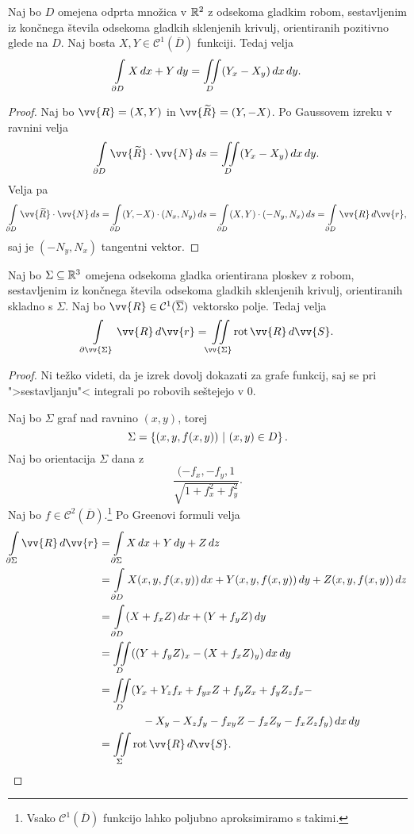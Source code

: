 \begin{izrek}
Naj bo $D$ omejena odprta množica v $\mathbb{R}^2$ z odsekoma gladkim
robom, sestavljenim iz končnega števila odsekoma gladkih sklenjenih
krivulj, orientiranih pozitivno glede na $D$. Naj bosta
$X, Y \in \mathcal{C}^1(\overline{D})$ funkciji. Tedaj velja
\[
\int\limits_{\partial D} X\,dx + Y\,dy = \iint\limits_D (Y_x - X_y)\,dx\,dy.
\]
\end{izrek}

\begin{proof}
Naj bo $\vv{R} = (X, Y)$ in $\vv{\widetilde{R}} = (Y, -X)$. Po
Gaussovem izreku v ravnini velja
\[
\lint_{\partial D} \vv{\widetilde{R}} \cdot \vv{N}\,ds =
\liint_D (Y_x - X_y)\,dx\,dy.
\]
Velja pa
\[
\lint_{\partial D} \vv{\widetilde{R}} \cdot \vv{N}\,ds =
\lint_{\partial D} (Y, -X) \cdot (N_x, N_y)\,ds =
\lint_{\partial D} (X, Y) \cdot (-N_y, N_x)\,ds =
\lint_{\partial D} \vv{R}\,d\vv{r},
\]
saj je $(-N_y, N_x)$ tangentni vektor.
\end{proof}

\begin{izrek}[Stokes]
Naj bo $\Sigma \subseteq \mathbb{R}^3$ omejena odsekoma gladka orientirana
ploskev z robom, sestavljenim iz končnega števila odsekoma gladkih
sklenjenih krivulj, orientiranih skladno s $\Sigma$. Naj bo
$\vv{R} \in \mathcal{C}^1(\overline{\Sigma})$ vektorsko polje.
Tedaj velja
\[
\lint_{\partial \vv{\Sigma}} \vv{R}\,d\vv{r} =
\liint_{\vv{\Sigma}} \rot\vv{R}\,d\vv{S}.
\]
\end{izrek}

\begin{proof}
Ni težko videti, da je izrek dovolj dokazati za grafe funkcij, saj
se pri ">sestavljanju"< integrali po robovih seštejejo v $0$.

Naj bo $\Sigma$ graf nad ravnino $(x, y)$, torej
\[
\Sigma = \left\{(x, y, f(x, y))~\middle\vert~(x, y) \in D\right\}.
\]
Naj bo orientacija $\Sigma$ dana z
\[
\frac{(-f_x, -f_y, 1}{\sqrt{1 + f_x^2 + f_y^2}}.
\]
Naj bo $f \in \mathcal{C}^2(\overline{D})$.\footnote{Vsako
$\mathcal{C}^1(\overline{D})$ funkcijo lahko poljubno aproksimiramo
s takimi.} Po Greenovi formuli velja
\begin{align*}
\lint_{\partial \Sigma} \vv{R}\,d\vv{r} &=
\lint_{\partial \Sigma} X\,dx + Y\,dy + Z\,dz
\\
&=
\lint_{\partial D}
X(x, y, f(x, y))\,dx +
Y(x, y, f(x, y))\,dy +
Z(x, y, f(x, y))\,dz
\\
&=
\lint_{\partial D} (X + f_x Z)\,dx + (Y + f_y Z)\,dy
\\
&=
\liint_D ((Y + f_y Z)_x - (X + f_x Z)_y)\,dx\,dy
\\
&=
\liint_D (Y_x + Y_z f_x + f_{yx} Z + f_y Z_x + f_y Z_z f_x -
\\
& \qquad \qquad-X_y - X_z f_y - f_{xy} Z - f_x Z_y - f_x Z_z f_y)\,dx\,dy
\\
&=
\liint_\Sigma \rot\vv{R}\,d\vv{S}. \qedhere
\end{align*}
\end{proof}
